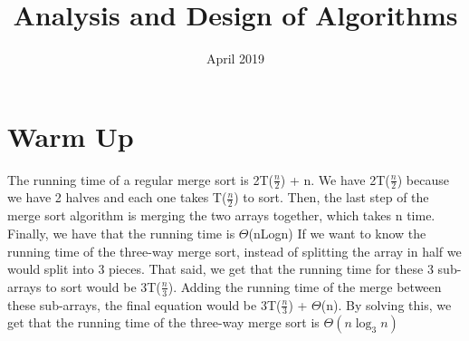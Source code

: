 \documentclass{article}
\title{Analysis and Design of Algorithms}
\date{April 2019}
\begin{document}
\maketitle

\section{Warm Up}
The running time of a regular merge sort is 2T(\( \frac{n}{2} \)) + n. We have 2T(\( \frac{n}{2} \)) because
we have 2 halves and each one takes T(\( \frac{n}{2} \)) to sort. Then, the last step of the merge sort algorithm is merging the two arrays together, which takes n time. Finally, we have that the running time is $\Theta$(nLogn) 
\newline
\newline
If we want to know the running time of the three-way merge sort, instead of splitting the array in half we would split into 3 pieces. That said, we get that the running time for these 3 sub-arrays to sort would be 3T(\( \frac{n}{3} \)). Adding the running time of the merge between these sub-arrays, the final equation would be 3T(\( \frac{n}{3} \)) + $\Theta$(n). By solving this, we get that the running time of the three-way merge sort is $\Theta(n{\log_3 n})$
\end{document}
